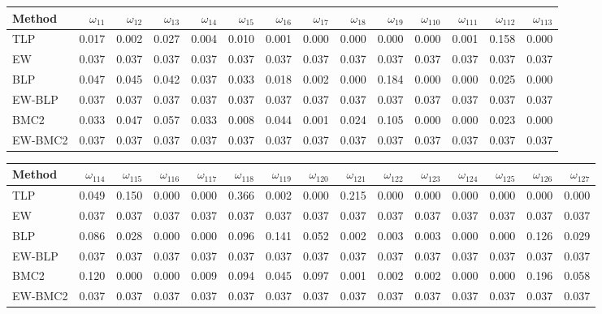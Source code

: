 \documentclass[
]{article}
\begin{document}
\begin{tabular}{lrrrrrrrrrrrrr}
\toprule
Method & $\omega_{11}$ & $\omega_{12}$ & $\omega_{13}$ & $\omega_{14}$ & $\omega_{15}$ & $\omega_{16}$ & $\omega_{17}$ & $\omega_{18}$ & $\omega_{19}$ & $\omega_{110}$ & $\omega_{111}$ & $\omega_{112}$ & $\omega_{113}$\\
\midrule
TLP & 0.017 & 0.002 & 0.027 & 0.004 & 0.010 & 0.001 & 0.000 & 0.000 & 0.000 & 0.000 & 0.001 & 0.158 & 0.000\\
EW & 0.037 & 0.037 & 0.037 & 0.037 & 0.037 & 0.037 & 0.037 & 0.037 & 0.037 & 0.037 & 0.037 & 0.037 & 0.037\\
BLP & 0.047 & 0.045 & 0.042 & 0.037 & 0.033 & 0.018 & 0.002 & 0.000 & 0.184 & 0.000 & 0.000 & 0.025 & 0.000\\
EW-BLP & 0.037 & 0.037 & 0.037 & 0.037 & 0.037 & 0.037 & 0.037 & 0.037 & 0.037 & 0.037 & 0.037 & 0.037 & 0.037\\
BMC2 & 0.033 & 0.047 & 0.057 & 0.033 & 0.008 & 0.044 & 0.001 & 0.024 & 0.105 & 0.000 & 0.000 & 0.023 & 0.000\\
EW-BMC2 & 0.037 & 0.037 & 0.037 & 0.037 & 0.037 & 0.037 & 0.037 & 0.037 & 0.037 & 0.037 & 0.037 & 0.037 & 0.037\\
\bottomrule
\end{tabular}

\begin{tabular}{lrrrrrrrrrrrrrr}
\toprule
Method & $\omega_{114}$ & $\omega_{115}$ & $\omega_{116}$ & $\omega_{117}$ & $\omega_{118}$ & $\omega_{119}$ & $\omega_{120}$ & $\omega_{121}$ & $\omega_{122}$ & $\omega_{123}$ & $\omega_{124}$ & $\omega_{125}$ & $\omega_{126}$ & $\omega_{127}$\\
\midrule
TLP & 0.049 & 0.150 & 0.000 & 0.000 & 0.366 & 0.002 & 0.000 & 0.215 & 0.000 & 0.000 & 0.000 & 0.000 & 0.000 & 0.000\\
EW & 0.037 & 0.037 & 0.037 & 0.037 & 0.037 & 0.037 & 0.037 & 0.037 & 0.037 & 0.037 & 0.037 & 0.037 & 0.037 & 0.037\\
BLP & 0.086 & 0.028 & 0.000 & 0.000 & 0.096 & 0.141 & 0.052 & 0.002 & 0.003 & 0.003 & 0.000 & 0.000 & 0.126 & 0.029\\
EW-BLP & 0.037 & 0.037 & 0.037 & 0.037 & 0.037 & 0.037 & 0.037 & 0.037 & 0.037 & 0.037 & 0.037 & 0.037 & 0.037 & 0.037\\
BMC2 & 0.120 & 0.000 & 0.000 & 0.009 & 0.094 & 0.045 & 0.097 & 0.001 & 0.002 & 0.002 & 0.000 & 0.000 & 0.196 & 0.058\\
EW-BMC2 & 0.037 & 0.037 & 0.037 & 0.037 & 0.037 & 0.037 & 0.037 & 0.037 & 0.037 & 0.037 & 0.037 & 0.037 & 0.037 & 0.037\\
\bottomrule
\end{tabular}
\end{document}
